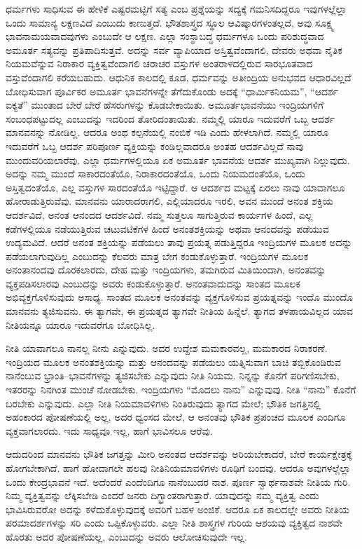 ಧರ್ಮಗಳು ಸಾಧಿಸುವ ಈ ಹೇಳಿಕೆ ಎಷ್ಟರಮಟ್ಟಿಗೆ ಸತ್ಯ ಎಂಬ ಪ್ರಶ್ನೆಯನ್ನು ಸದ್ಯಕ್ಕೆ ಗಮನಿಸದಿದ್ದರೂ ಇವುಗಳಲ್ಲೆಲ್ಲಾ ಒಂದು ಸಾಮಾನ್ಯ ಲಕ್ಷಣವಿದೆ ಎಂಬುದು ಕಾಣುತ್ತದೆ. ಭೌತಶಾಸ್ತ್ರದ ಸ್ಥೂಲ ಆವಿಷ್ಕಾರಗಳಂತಲ್ಲದೆ, ಅವು ಸೂಕ್ಷ್ಮ ಭಾವನಾಮಯವಾದವುಗಳು ಎಂಬುದೇ ಆ ಲಕ್ಷಣ. ಎಲ್ಲಾ ಸಂಸ್ಥಾಬದ್ಧ ಧರ್ಮಗಳೂ ಒಂದು ಪರಿಶುದ್ಧವಾದ ಅಮೂರ್ತ ಸತ್ಯವನ್ನು ಪ್ರತಿಪಾದಿಸುತ್ತವೆ. ಅದನ್ನು ಸರ್ವ ವ್ಯಾಪಿಯಾದ ಅಸ್ತಿತ್ವವೆಂದಾಗಲಿ, ದೇವರು ಅಥವಾ ನೈತಿಕ ನಿಯಮವೆನ್ನುವ ನಿರಾಕಾರ ವ್ಯಕ್ತಿತ್ವವೆಂದಾಗಲಿ ಚರಾಚರ ವಸ್ತುಗಳ ಅಂತರಾಳದಲ್ಲಿರುವ ಸಾರಭೂತವಾದ ವಸ್ತುವೆಂದಾಗಲಿ ಕರೆಯಬಹುದು. ಆಧುನಿಕ ಕಾಲದಲ್ಲಿ ಕೂಡ, ಧರ್ಮವನ್ನು ಅತೀಂದ್ರಿಯ ಅನುಭವದ ಆಧಾರವಿಲ್ಲದೆ ಬೋಧಿಸುವಾಗ ಪೂರ್ವಿಕರ ಅಮೂರ್ತ ಭಾವನೆಗಳನ್ನೇ ತೆಗೆದುಕೊಂಡು ಅದಕ್ಕೆ “ಧಾರ್ಮಿಕನಿಯಮ”, “ಆದರ್ಶ ಐಕ್ಯತೆ” ಮುಂತಾದ ಬೇರೆ ಬೇರೆ ಹೆಸರುಗಳನ್ನು ಕೊಡಬೇಕಾಯಿತು. ಅಮೂರ್ತಭಾವನೆಯು ಇಂದ್ರಿಯಗಳಿಗೆ ಸಂಬಂಧಪಟ್ಟುದಲ್ಲ ಎಂಬುದನ್ನು ಇದರಿಂದ ತೋರಿದಂತಾಯಿತು. ನಮ್ಮಲ್ಲಿ ಯಾರೂ ಇದುವರೆಗೆ ಒಬ್ಬ ಆದರ್ಶ ಮಾನವನನ್ನು ನೋಡಿಲ್ಲ. ಆದರೂ ಅಂಥ ಕಲ್ಪನೆಯಲ್ಲಿ ನಂಬಿಕೆ ಇಡಿ ಎಂದು ಹೇಳಲಾಗಿದೆ. ನಮ್ಮಲ್ಲಿ ಯಾರೂ ಇದುವರೆಗೆ ಒಬ್ಬ ಆದರ್ಶ ಪರಿಪೂರ್ಣ ವ್ಯಕ್ತಿಯನ್ನು ಕಂಡಿಲ್ಲವಾದರೂ ಅಂತಹ ಆದರ್ಶವಿಲ್ಲದೆ ನಾವು ಮುಂದುವರಿಯಲಾರೆವು. ಎಲ್ಲಾ ಧರ್ಮಗಳಲ್ಲಿಯೂ ಏಕ ಅಮೂರ್ತ ಭಾವನೆಯ ಆದರ್ಶ ಮುಖ್ಯವಾಗಿ ನಿಲ್ಲುವುದು. ಅದನ್ನು ನಮ್ಮ ಮುಂದೆ ಸಾಕಾರದಂತೆಯೊ, ನಿರಾಕಾರದಂತೆಯೊ, ಒಂದು ನಿಯಮದಂತೆಯೊ, ಒಂದು ಅಸ್ತಿತ್ವದಂತೆಯೊ, ಎಲ್ಲ ವಸ್ತುಗಳ ಸಾರದಂತೆಯೊ ಇಟ್ಟಿದ್ದಾರೆ. ಆ ಆದರ್ಶದ ಮಟ್ಟಕ್ಕೆ ಏರಲು ನಾವು ಯಾವಾಗಲೂ ಹೋರಾಡುತ್ತಿರುವೆವು. ಮಾನವನು ಯಾರಾದರಾಗಲಿ, ಎಲ್ಲಿಯಾದರೂ ಇರಲಿ, ಅವನ ಮುಂದೆ ಅನಂತ ಶಕ್ತಿಯ ಆದರ್ಶವಿದೆ, ಅನಂತ ಆನಂದದ ಆದರ್ಶವಿದೆ. ನಮ್ಮ ಸುತ್ತಲೂ ಸಾಗುತ್ತಿರುವ ಕಾರ್ಯಗಳ ಹಿಂದೆ, ಎಲ್ಲ ಕಡೆಗಳಲ್ಲಿಯೂ ನಡೆಯುತ್ತಿರುವ ಚಟುವಟಿಕೆಗಳ ಹಿಂದೆ ಅನಂತಶಕ್ತಿಯನ್ನು ಅಥವಾ ಆನಂದವನ್ನು ಪಡೆಯುವ ಉದ್ಯಮವಿದೆ. ಆದರೆ ಅನಂತ ಶಕ್ತಿಯನ್ನು ಪಡೆಯಲು ತಾವು ಪ್ರಯತ್ನ ಪಡುತ್ತಿದ್ದರೂ ಇಂದ್ರಿಯಗಳ ಮೂಲಕ ಅದನ್ನು ಪಡೆಯಲಾಗುವುದಿಲ್ಲ ಎಂಬುದನ್ನು ಕೆಲವರು ಮಾತ್ರ ಬೇಗ ಕಂಡುಕೊಳ್ಳುತ್ತಾರೆ. ಇಂದ್ರಿಯಗಳ ಮೂಲಕ ಅನಂತಾನಂದವು ದೊರಕಲಾರದು, ದೇಹ ಮತ್ತು ಇಂದ್ರಿಯಗಳು, ತಮಗಿರುವ ಮಿತಿಯಿಂದಾಗಿ, ಅನಂತವನ್ನು ವ್ಯಕ್ತಪಡಿಸಲಾರವು ಎಂಬುದನ್ನು ಅವರು ಕಂಡುಕೊಳ್ಳುತ್ತಾರೆ. ಅನಂತವಾದುದನ್ನು ಸಾಂತದ ಮೂಲಕ ಅಭಿವ್ಯಕ್ತಗೊಳಿಸುವುದು ಅಸಾಧ್ಯ. ಸಾಂತದ ಮೂಲಕ ಅನಂತವನ್ನು ವ್ಯಕ್ತಗೊಳಿಸುವ ಪ್ರಯತ್ನವನ್ನು ಇಂದೊ ಮುಂದೊ ಮಾನವನು ತ್ಯಜಿಸುವನು. ಈ ತ್ಯಾಗವೇ, ಈ ಪ್ರಯತ್ನದ ತ್ಯಾಗವೇ ನೀತಿಯ ಹಿನ್ನೆಲೆ. ತ್ಯಾಗದ ತಳಪಾಯವಿಲ್ಲದ ಯಾವ ನೀತಿಯನ್ನೂ ಯಾರೂ ಇದುವರೆಗೂ ಬೋಧಿಸಿಲ್ಲ.

ನೀತಿ ಯಾವಾಗಲೂ ನಾನಲ್ಲ ನೀನು ಎನ್ನುವುದು. ಅದರ ಉದ್ದೇಶ ಮಮಕಾರವಲ್ಲ, ಮಮಕಾರದ ನಿರಾಕರಣೆ. ಇಂದ್ರಿಯದ ಮೂಲಕ ಅನಂತಶಕ್ತಿಯನ್ನು ಮತ್ತು ಆನಂದವನ್ನು ಪಡೆಯಲು ಯತ್ನಿಸುವಾಗ ಬಾಚಿ ತಬ್ಬಿಕೊಂಡಿರುವ ನಾನೆಂಬುವ ಭ್ರಾಂತಿ–ಭಾವನೆಗಳನ್ನು ತ್ಯಜಿಸಬೇಕು ಎನ್ನುವುದು ನೀತಿ ನಿಯಮ. ನಿನ್ನನ್ನು ಕೊನೆಗೆ ಪರಿಗಣಿಸಬೇಕು, ಇತರರನ್ನು ನಿನಗಿಂತ ಮುಂಚೆ ನೋಡಬೇಕು. ಇಂದ್ರಿಯಗಳು “ಮೊದಲು ನಾನು” ಎನ್ನುವುವು. ನೀತಿ “ನಾನು” ಕೊನೆಗೆ ಬರಬೇಕು ಎನ್ನುವುದು. ಎಲ್ಲಾ ನೀತಿ ನಿಯಮಾವಳಿಗಳು ನಿಂತಿರುವುದು ತ್ಯಾಗದ ಮೇಲೆ; ಭೌತಿಕ ಜಗತ್ತಿನಲ್ಲಿ ಅಹಂಕಾರದ ಪೋಷಣೆಯಲ್ಲಿ ಅಲ್ಲ, ಅದರ ಧ್ವಂಸದ ಮೇಲೆ, ಆ ಅನಂತವು ಭೌತಿಕ ಪ್ರಪಂಚದ ಮೂಲಕ ಎಂದಿಗೂ ವ್ಯಕ್ತವಾಗಲಾರದು. ಇದು ಸಾಧ್ಯವೂ ಇಲ್ಲ, ಹಾಗೆ ಭಾವಿಸಲೂ ಆರೆವು.

ಆದುದರಿಂದ ಮಾನವನು ಭೌತಿಕ ಜಗತ್ತನ್ನು ಮೀರಿ ಅನಂತದ ಆದರ್ಶವನ್ನು ಅರಿಯಬೇಕಾದರೆ, ಬೇರೆ ಕಾರ್ಯಕ್ಷೇತ್ರಕ್ಕೆ ಹೋಗಬೇಕಾಗಿದೆ. ಹಾಗೆ ಹೋದಾಗಲೇ ಹಲವು ನೀತಿನಿಯಮಾವಳಿಗಳು ರೂಢಿಗೆ ಬಂದವು. ಆದರೂ ಅವುಗಳಲ್ಲೆಲ್ಲಾ ಒಂದು ಕೇಂದ್ರಭಾವನೆ ಇದೆ. ಅದೆಂದರೆ ಎಂದೆಂದಿಗೂ ನಾನೆಂಬುದರ ನಾಶ. ಪೂರ್ಣ ಸ್ವಾರ್ಥನಾಶವೇ ನೀತಿಯ ಗುರಿ. ನಿಮ್ಮ ವ್ಯಕ್ತಿತ್ವವನ್ನು ಲೆಕ್ಕಿಸಬೇಡಿ ಎಂದರೆ ಜನರು ದಿಗ್ಭ್ರಾಂತರಾಗುತ್ತಾರೆ. ಯಾವುದನ್ನು ನಮ್ಮ ವ್ಯಕ್ತಿತ್ವ ಎಂದು ಭಾವಿಸಿರುವರೋ ಅದನ್ನು ಕಳೆದುಕೊಳ್ಳುವುದಕ್ಕೆ ಅವರಿಗೆ ಬಹಳ ಅಂಜಿಕೆ. ಆದರೂ ಏಕ ಕಾಲದಲ್ಲೇ ಅವರು ನೀತಿಯ ಪರಮಾದರ್ಶಗಳನ್ನು ಸರಿ ಎಂದು ಒಪ್ಪಿಕೊಳ್ಳುವರು. ಎಲ್ಲಾ ನೀತಿ ಶಾಸ್ತ್ರಗಳ ಗುರಿಯ ಆಶಯವು ವ್ಯಕ್ತಿತ್ವದ ನಾಶವೇ ಹೊರತು ಅದರ ಪೋಷಣೆಯಲ್ಲ, ಎಂಬುದನ್ನು ಅವರು ಆಲೋಚಿಸುವುದೇ ಇಲ್ಲ.

